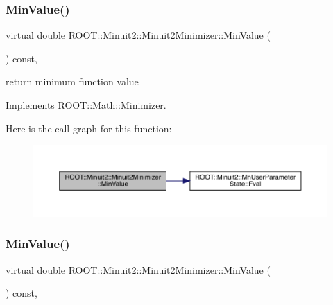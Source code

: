 \subsubsection{\texorpdfstring{MinValue()}{MinValue()}\hspace{0.1cm}{\footnotesize\ttfamily [1/2]}}
{\footnotesize\ttfamily virtual double R\+O\+O\+T\+::\+Minuit2\+::\+Minuit2\+Minimizer\+::\+Min\+Value (\begin{DoxyParamCaption}{ }\end{DoxyParamCaption}) const\hspace{0.3cm}{\ttfamily [inline]}, {\ttfamily [virtual]}}



return minimum function value 



Implements \mbox{\hyperlink{classROOT_1_1Math_1_1Minimizer_ae4845ff42bc0e244fdfa068c53b9a965}{R\+O\+O\+T\+::\+Math\+::\+Minimizer}}.

Here is the call graph for this function\+:
\nopagebreak
\begin{figure}[H]
\begin{center}
\leavevmode
\includegraphics[width=350pt]{d0/d9c/classROOT_1_1Minuit2_1_1Minuit2Minimizer_a4a1c7fc174527aefab3d8c87bf8c0672_cgraph}
\end{center}
\end{figure}
\mbox{\label{classROOT_1_1Minuit2_1_1Minuit2Minimizer_a4a1c7fc174527aefab3d8c87bf8c0672}} 
\subsubsection{\texorpdfstring{MinValue()}{MinValue()}\hspace{0.1cm}{\footnotesize\ttfamily [2/2]}}
{\footnotesize\ttfamily virtual double R\+O\+O\+T\+::\+Minuit2\+::\+Minuit2\+Minimizer\+::\+Min\+Value (\begin{DoxyParamCaption}{ }\end{DoxyParamCaption}) const\hspace{0.3cm}{\ttfamily [inline]}, {\ttfamily [virtual]}}



